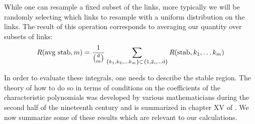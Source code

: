 While one can resample a fixed subset of the links, more typically we will be randomly selecting which links to resample with a uniform distribution on the links.  The result of this operation corresponds to averaging our quantity over subsets of links:
\begin{equation}
R (\hbox{avg stab}, m) =
\frac{1}{\binom{\mathrm{d}}{m}}
\sum_{\{k_1, k_2, \ldots k_m\} \subset \{1, 2,, \ldots \mathrm{d}\}}
R (\mathrm{stab}, k_1, \ldots k_m)
\end{equation}

In order to evaluate these integrals, one needs to describe the stable region.
The theory of how to do so in terms of conditions on the coefficients of the
characteristic polynomials was developed by various mathematicians during the
second half of the nineteenth century and is summarized in chapter XV of
\cite{Gantmacher1959}.  We now summarize some of these results which are
relevant to our calculations.

